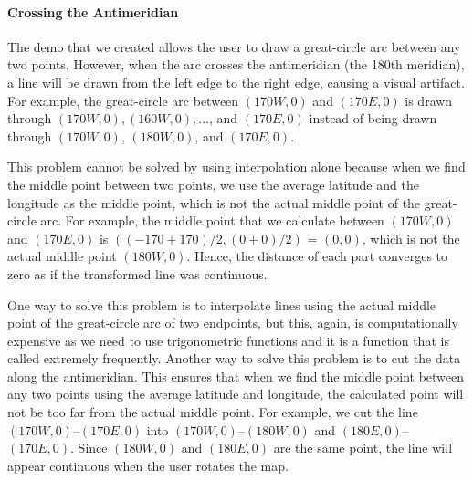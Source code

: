 \paragraph{Crossing the Antimeridian}


The demo that we created allows the user to draw a great-circle arc between any two points. However, when the arc crosses the antimeridian (the 180th meridian), a line will be drawn from the left edge to the right edge, causing a visual artifact. For example, the great-circle arc between $(170W, 0)$ and $(170E, 0)$ is drawn through  $(170W, 0), (160W, 0), \dots$, and $(170E, 0)$ instead of being drawn through $(170W, 0)$, $(180W, 0)$, and $(170E, 0)$.



This problem cannot be solved by using interpolation alone because when we find the middle point between two points, we use the average latitude and the longitude as the middle point, which is not the actual middle point of the great-circle arc. For example, the middle point that we calculate between $(170W, 0)$ and $(170E, 0)$ is $((-170+170)/2,(0+0)/2)$ = $(0, 0)$, which is not the actual middle point $(180W, 0)$. Hence, the distance of each part converges to zero as if the transformed line was continuous.

One way to solve this problem is to interpolate lines using the actual middle point of the great-circle arc of two endpoints, but this, again, is computationally expensive as we need to use trigonometric functions and it is a function that is called extremely frequently. Another way to solve this problem is to cut the data along the antimeridian. This ensures that when we find the middle point between any two points using the average latitude and longitude, the calculated point will not be too far from the actual middle point. For example, we cut the line $(170W, 0)$--$(170E, 0)$ into $(170W, 0)$--$(180W, 0)$  and $(180E, 0)$--$(170E, 0)$. Since $(180W, 0)$ and $(180E, 0)$ are the same point, the line will appear continuous when the user rotates the map.

